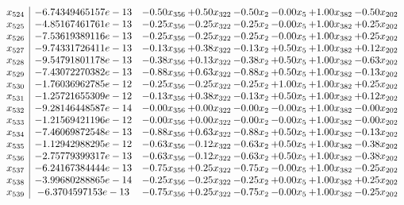 \documentclass[8pt]{article}
\begin{document}
\[\begin{array}{c| c c@{\hskip 2pt} c@{\hskip 2pt} c@{\hskip 2pt} c@{\hskip 2pt} c@{\hskip 2pt} c@{\hskip 2pt} }
 x_{524}   &  -6.74349465157e-13 & -0.50 x_{356} & +  0.50 x_{322} & -0.50 x_{2} & -0.00 x_{5} & +  1.00 x_{382} & -0.50 x_{202}\\
 x_{525}   &  -4.85167461761e-13 & -0.25 x_{356} & -0.25 x_{322} & -0.25 x_{2} & -0.00 x_{5} & +  1.00 x_{382} & +  0.25 x_{202}\\
 x_{526}   &  -7.53619389116e-13 & -0.25 x_{356} & -0.25 x_{322} & -0.25 x_{2} & -0.00 x_{5} & +  1.00 x_{382} & +  0.25 x_{202}\\
 x_{527}   &  -9.74331726411e-13 & -0.13 x_{356} & +  0.38 x_{322} & -0.13 x_{2} & +  0.50 x_{5} & +  1.00 x_{382} & +  0.12 x_{202}\\
 x_{528}   &  -9.54791801178e-13 & -0.38 x_{356} & +  0.13 x_{322} & -0.38 x_{2} & +  0.50 x_{5} & +  1.00 x_{382} & -0.63 x_{202}\\
 x_{529}   &  -7.43072270382e-13 & -0.88 x_{356} & +  0.63 x_{322} & -0.88 x_{2} & +  0.50 x_{5} & +  1.00 x_{382} & -0.13 x_{202}\\
 x_{530}   &  -1.76036962785e-12 & -0.25 x_{356} & -0.25 x_{322} & -0.25 x_{2} & +  1.00 x_{5} & +  1.00 x_{382} & +  0.25 x_{202}\\
 x_{531}   &  -1.25721655309e-12 & -0.13 x_{356} & +  0.38 x_{322} & -0.13 x_{2} & +  0.50 x_{5} & +  1.00 x_{382} & +  0.12 x_{202}\\
 x_{532}   &  -9.28146448587e-14 & -0.00 x_{356} & +  0.00 x_{322} & -0.00 x_{2} & -0.00 x_{5} & +  1.00 x_{382} & -0.00 x_{202}\\
 x_{533}   &  -1.21569421196e-12 & -0.00 x_{356} & +  0.00 x_{322} & -0.00 x_{2} & -0.00 x_{5} & +  1.00 x_{382} & -0.00 x_{202}\\
 x_{534}   &  -7.46069872548e-13 & -0.88 x_{356} & +  0.63 x_{322} & -0.88 x_{2} & +  0.50 x_{5} & +  1.00 x_{382} & -0.13 x_{202}\\
 x_{535}   &  -1.12942988295e-12 & -0.63 x_{356} & -0.12 x_{322} & -0.63 x_{2} & +  0.50 x_{5} & +  1.00 x_{382} & -0.38 x_{202}\\
 x_{536}   &  -2.75779399317e-13 & -0.63 x_{356} & -0.12 x_{322} & -0.63 x_{2} & +  0.50 x_{5} & +  1.00 x_{382} & -0.38 x_{202}\\
 x_{537}   &  -6.24167384444e-13 & -0.75 x_{356} & +  0.25 x_{322} & -0.75 x_{2} & -0.00 x_{5} & +  1.00 x_{382} & -0.25 x_{202}\\
 x_{538}   &  -3.99680288865e-14 & -0.25 x_{356} & -0.25 x_{322} & -0.25 x_{2} & +  0.00 x_{5} & +  1.00 x_{382} & +  0.25 x_{202}\\
 x_{539}   &  -6.3704597153e-13 & -0.75 x_{356} & +  0.25 x_{322} & -0.75 x_{2} & -0.00 x_{5} & +  1.00 x_{382} & -0.25 x_{202}\\

\end{array}\]
\end{document}
